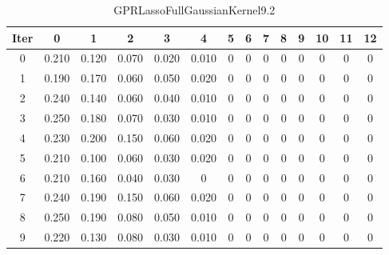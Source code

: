 \begin{table}
	\begin{center}
		\begin{tabular}{|c|c|c|c|c|c|c|c|c|c|c|c|c|c|}
			\hline
			Iter & 0 & 1 & 2 & 3 & 4 & 5 & 6 & 7 & 8 & 9 & 10 & 11 & 12 \\
			\hline
			0 & 0.210 & 0.120 & 0.070 & 0.020 & 0.010 & 0 & 0 & 0 & 0 & 0 & 0 & 0 & 0 \\
			\hline
			1 & 0.190 & 0.170 & 0.060 & 0.050 & 0.020 & 0 & 0 & 0 & 0 & 0 & 0 & 0 & 0 \\
			\hline
			2 & 0.240 & 0.140 & 0.060 & 0.040 & 0.010 & 0 & 0 & 0 & 0 & 0 & 0 & 0 & 0 \\
			\hline
			3 & 0.250 & 0.180 & 0.070 & 0.030 & 0.010 & 0 & 0 & 0 & 0 & 0 & 0 & 0 & 0 \\
			\hline
			4 & 0.230 & 0.200 & 0.150 & 0.060 & 0.020 & 0 & 0 & 0 & 0 & 0 & 0 & 0 & 0 \\
			\hline
			5 & 0.210 & 0.100 & 0.060 & 0.030 & 0.020 & 0 & 0 & 0 & 0 & 0 & 0 & 0 & 0 \\
			\hline
			6 & 0.210 & 0.160 & 0.040 & 0.030 & 0 & 0 & 0 & 0 & 0 & 0 & 0 & 0 & 0 \\
			\hline
			7 & 0.240 & 0.190 & 0.150 & 0.060 & 0.020 & 0 & 0 & 0 & 0 & 0 & 0 & 0 & 0 \\
			\hline
			8 & 0.250 & 0.190 & 0.080 & 0.050 & 0.010 & 0 & 0 & 0 & 0 & 0 & 0 & 0 & 0 \\
			\hline
			9 & 0.220 & 0.130 & 0.080 & 0.030 & 0.010 & 0 & 0 & 0 & 0 & 0 & 0 & 0 & 0 \\
			\hline
		\end{tabular}
	\end{center}
	\caption{GPRLassoFullGaussianKernel9.2}
\end{table}